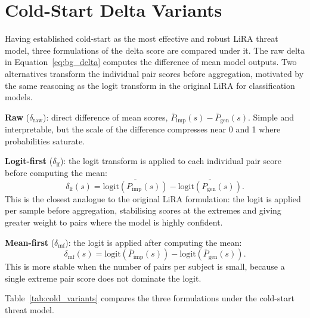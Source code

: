 \section{Cold-Start Delta Variants}
\label{sec:mia_delta_variants}

Having established cold-start as the most effective and robust LiRA threat model, three formulations of the delta score are compared under it. The raw delta in Equation~\eqref{eq:bg_delta} computes the difference of mean model outputs. Two alternatives transform the individual pair scores before aggregation, motivated by the same reasoning as the logit transform in the original LiRA for classification models.

\textbf{Raw} ($\delta_\text{raw}$): direct difference of mean scores,
$\bar{P}_\text{imp}(s) - \bar{P}_\text{gen}(s)$. Simple and interpretable, but the scale of the difference compresses near 0 and 1 where probabilities saturate.

\textbf{Logit-first} ($\delta_\text{lf}$): the logit transform is applied to
each individual pair score before computing the mean:
\begin{equation}
  \delta_\text{lf}(s)
  = \overline{\mathrm{logit}\!\left(P_\text{imp}(s)\right)}
  - \overline{\mathrm{logit}\!\left(P_\text{gen}(s)\right)}.
\end{equation}
This is the closest analogue to the original LiRA formulation: the logit is applied per sample before aggregation, stabilising scores at the extremes and giving greater weight to pairs where the model is highly confident.

\textbf{Mean-first} ($\delta_\text{mf}$): the logit is applied after computing
the mean:
\begin{equation}
  \delta_\text{mf}(s)
  = \mathrm{logit}\!\left(\bar{P}_\text{imp}(s)\right)
  - \mathrm{logit}\!\left(\bar{P}_\text{gen}(s)\right).
\end{equation}
This is more stable when the number of pairs per subject is small, because a single extreme pair score does not dominate the logit.

Table~\ref{tab:cold_variants} compares the three formulations under the cold-start threat model.

